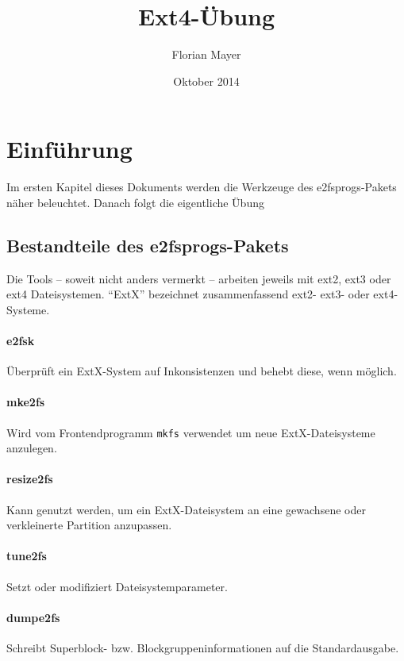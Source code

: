 \documentclass[11pt,a4paper]{article}
\def\inlinebash{\lstinline[style=bash]}
\begin{document}
\title{\color{black} Ext4-Übung}
\author{\color{darkblue} Florian Mayer}
\date{\color{lightblue} Oktober 2014}
\maketitle

\tableofcontents

\section{Einführung}
Im ersten Kapitel dieses Dokuments werden die 
Werkzeuge des e2fsprogs-Pakets näher beleuchtet.
Danach folgt die eigentliche Übung

\subsection{Bestandteile des e2fsprogs-Pakets}
Die Tools -- soweit nicht anders vermerkt -- arbeiten 
jeweils mit ext2, ext3 oder ext4 Dateisystemen. ``ExtX'' bezeichnet
zusammenfassend ext2- ext3- oder ext4-Systeme.

\paragraph{e2fsk}
	Überprüft ein ExtX-System auf Inkonsistenzen und behebt diese, wenn möglich.

\paragraph{mke2fs}
	Wird vom Frontendprogramm \inlinebash$mkfs$ verwendet um neue ExtX-Dateisysteme anzulegen.

\paragraph{resize2fs}
	Kann genutzt werden, um ein ExtX-Dateisystem an eine gewachsene oder
	verkleinerte Partition anzupassen.

\paragraph{tune2fs}
	Setzt oder modifiziert Dateisystemparameter.

\paragraph{dumpe2fs}
	Schreibt Superblock- bzw. Blockgruppeninformationen auf die Standardausgabe.
\end{document}
